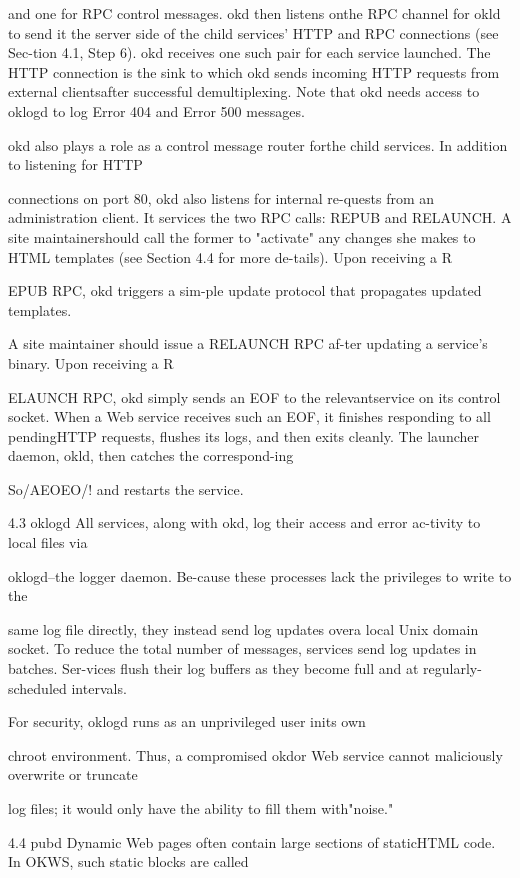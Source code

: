 and one for RPC control messages. okd then listens onthe RPC channel for okld to send it the server side of
the child services' HTTP and RPC connections (see Sec-tion 4.1, Step 6). okd receives one such pair for each service launched. The HTTP connection is the sink to which
okd sends incoming HTTP requests from external clientsafter successful demultiplexing. Note that okd needs access to oklogd to log Error 404 and Error 500 messages.

okd also plays a role as a control message router forthe child services. In addition to listening for HTTP

connections on port 80, okd also listens for internal re-quests from an administration client. It services the two
RPC calls: REPUB and RELAUNCH. A site maintainershould call the former to "activate" any changes she
makes to HTML templates (see Section 4.4 for more de-tails). Upon receiving a R

EPUB RPC, okd triggers a sim-ple update protocol that propagates updated templates.

A site maintainer should issue a RELAUNCH RPC af-ter updating a service's binary. Upon receiving a R

ELAUNCH RPC, okd simply sends an EOF to the relevantservice on its control socket. When a Web service receives such an EOF, it finishes responding to all pendingHTTP requests, flushes its logs, and then exits cleanly.
The launcher daemon, okld, then catches the correspond-ing

So/AEOEO/! and restarts the service.

4.3 oklogd
All services, along with okd, log their access and error ac-tivity to local files via

oklogd--the logger daemon. Be-cause these processes lack the privileges to write to the

same log file directly, they instead send log updates overa local Unix domain socket. To reduce the total number
of messages, services send log updates in batches. Ser-vices flush their log buffers as they become full and at
regularly-scheduled intervals.

For security, oklogd runs as an unprivileged user inits own

chroot environment. Thus, a compromised okdor Web service cannot maliciously overwrite or truncate

log files; it would only have the ability to fill them with"noise."

4.4 pubd
Dynamic Web pages often contain large sections of staticHTML code. In OKWS, such static blocks are called

